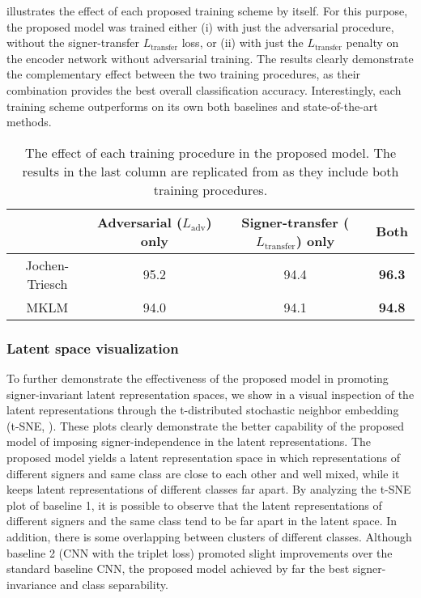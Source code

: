  illustrates the effect of each proposed training scheme by itself. For this purpose, the proposed model was trained either (i) with just the adversarial procedure, without the signer-transfer $L_{\text{transfer}}$ loss, or (ii) with just the $L_{\text{transfer}}$ penalty on the encoder network without adversarial training. The results clearly demonstrate the complementary effect between the two training procedures, as their combination provides the best overall classification accuracy. Interestingly, each training scheme outperforms on its own both baselines and state-of-the-art methods.

\begin{table}[t]
    \centering
    \begin{small}
        \begin{tabular}{c|c c : c }
            & Adversarial ($L_{\text{adv}}$) only  & Signer-transfer ($L_{\text{transfer}}$) only & Both \\ \hline
            Jochen-Triesch                              & 95.2            & 94.4                & \textbf{96.3}        \\
            MKLM            & 94.0            & 94.1                & \textbf{94.8}
        \end{tabular}
    \end{small}
    \caption{\centering The effect of each training procedure in the proposed model. The results in the last column are replicated from  as they include both training procedures.}
    \label{tab:loss_terms}
\end{table}

\subsubsection{Latent space visualization}
\label{sec:adv_signer_inv_tsne}
To further demonstrate the effectiveness of the proposed model in promoting signer-invariant latent representation spaces, we show in  a visual inspection of the latent representations through the t-distributed stochastic neighbor embedding (t-SNE, \citet{Maaten2008}). These plots clearly demonstrate the better capability of the proposed model of imposing signer-independence in the latent representations. The proposed model yields a latent representation space in which representations of different signers and same class are close to each other and well mixed, while it keeps latent representations of different classes far apart. By analyzing the t-SNE plot of baseline 1, it is possible to observe that the latent representations of different signers and the same class tend to be far apart in the latent space. In addition, there is some overlapping between clusters of different classes. Although baseline 2 (CNN with the triplet loss) promoted slight improvements over the standard baseline CNN, the proposed model achieved by far the best signer-invariance and class separability.


